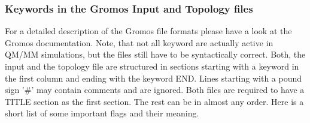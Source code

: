 \documentclass[twoside,10pt,titlepage,a4paper]{article}
\begin{document}
\subsubsection{Keywords in the Gromos Input and Topology files}
\label{sec:qmmm-gromos-inp}
For a detailed description of the Gromos file formats please
have a look at the Gromos documentation\cite{gromos96}. Note, that
not all keyword are actually active in QM/MM simulations, but the
files still have to be syntactically correct.
Both, the input and the topology file are structured in sections
starting with a keyword in the first column and ending with the
keyword END. Lines starting with a pound sign '\#' may contain
comments and are ignored. Both files are required to have a
TITLE section as the first section. The rest can be in almost
any order. Here is a short list of some important flags and
their meaning.
\end{document}
